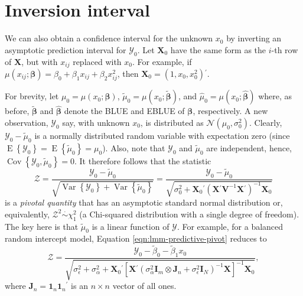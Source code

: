 \documentclass[cmfont,usenames,dvipsnames,leqno]{afit-etd}\usepackage[]{graphicx}\usepackage[]{color}
\newcommand{\trans}{\ensuremath{^\prime}}
\newcommand{\bc}[1]{\ensuremath{\bm{\mathcal{#1}}}}
\newcommand{\mc}[1]{\ensuremath{\mathcal{#1}}}
\newcommand{\wh}[1]{\ensuremath{\widehat{#1}}}
\newcommand{\E}{\operatorname{E}}
\newcommand{\var}{\operatorname{Var}}
\newcommand{\cov}{\operatorname{Cov}}
\newcommand{\X}{\ensuremath{\bm{X}}}
\begin{document}
\section{Inversion interval}
\label{sec:calibration-lmm-inversion}
We can also obtain a confidence interval for the unknown $x_0$ by inverting an asymptotic prediction interval for $\mc{Y}_0$. Let $\X_0$ have the same form as the $i$-th row of $\X$, but with $x_{ij}$ replaced with $x_0$. For example, if $\mu\left(x_{ij}; \bm{\beta}\right) = \beta_0 + \beta_1 x_{ij} + \beta_2 x_{ij}^2$, then $\X_0 = \left(1, x_0, x_0^2\right)\trans$. 

For brevity, let $\mu_0 = \mu\left(x_0; \bm{\beta}\right)$, $\widetilde{\mu}_0 = \mu\left(x_0; \widetilde{\bm{\beta}}\right)$, and $\wh{\mu}_0 = \mu\left(x_0; \wh{\bm{\beta}}\right)$ where, as before, $\widetilde{\bm{\beta}}$ and $\wh{\bm{\beta}}$ denote the \ac{BLUE} and \ac{EBLUE} of $\bm{\beta}$, respectively. A new observation, $\mc{Y}_0$ say, with unknown $x_0$, is distributed as $\mc{N}\left(\mu_0, \sigma_0^2\right)$. Clearly, $\mc{Y}_0 - \widetilde{\mu}_0$ is a normally distributed random variable with expectation zero (since $\E\left\{\mc{Y}_0\right\} = \E\left\{\widetilde{\mu}_0\right\} = \mu_0$). Also, note that $\mc{Y}_0$ and $\widetilde{\mu}_0$ are independent, hence, $\cov\left\{\mc{Y}_0, \widetilde{\mu}_0\right\} = 0$. It therefore follows that the statistic 
\begin{equation}
\label{eqn:lmm-predictive-pivot}
  \mc{Z} = \frac{\mc{Y}_0 - \widetilde{\mu}_0}{\sqrt{\var\left\{\mc{Y}_0\right\} + \var\left\{\widetilde{\mu}_0\right\}}} = \frac{\mc{Y}_0 - \widetilde{\mu}_0}{\sqrt{\sigma_0^2 + \X_0\trans\left(\X\trans\bm{V}^{-1}\X\trans\right)^{-1}\X_0}}
\end{equation}
is a \textit{pivotal quantity} that has an asymptotic standard normal distribution or, equivalently, $\mc{Z}^2 \stackrel{\cdot}{\sim} \chi_1^2$ (a Chi-squared distribution with a single degree of freedom). The key here is that $\widetilde{\mu}_0$ is a linear function of $\bc{Y}$. For example, for a balanced random intercept model, Equation \eqref{eqn:lmm-predictive-pivot} reduces to
\begin{equation*}
  \mc{Z} = \frac{\mc{Y}_0 - \widetilde{\beta}_0 - \widetilde{\beta}_1 x_0}{\sqrt{\sigma_\epsilon^2 + \sigma_\alpha^2 + \X_0\trans\left[\X\trans\left( \sigma_\alpha^2\bm{I}_m \otimes \bm{J}_n + \sigma_\epsilon^2\bm{I}_N \right)^{-1}\X\right]^{-1}\X_0}},
\end{equation*}
where $\bm{J}_n = \bm{1}_n\bm{1}_n\trans$ is an $n \times n$ vector of all ones.
\end{document}
